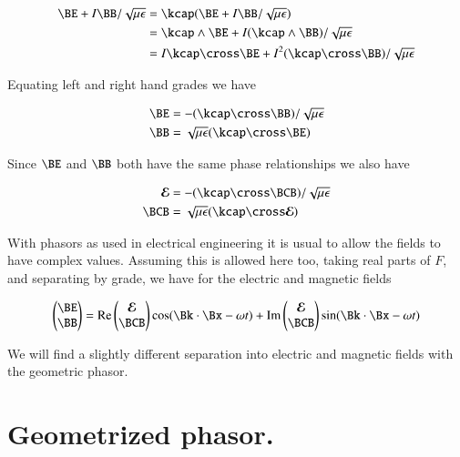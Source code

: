 \begin{align*}
\BE + I\BB/\sqrt{\mu\epsilon} 
&= \kcap (\BE + I\BB/\sqrt{\mu\epsilon} ) \\
&= \kcap \wedge \BE + I (\kcap \wedge \BB)/\sqrt{\mu\epsilon}  \\
&= I \kcap \cross \BE + I^2 (\kcap \cross \BB)/\sqrt{\mu\epsilon} 
\end{align*}

Equating left and right hand grades we have

\begin{align}\label{eqn:transverseWave:fooD}
\BE &= -(\kcap \cross \BB)/\sqrt{\mu\epsilon} \\
\BB &= \sqrt{\mu\epsilon} (\kcap \cross \BE)
\end{align}

Since $\BE$ and $\BB$ both have the same phase relationships we also have 

\begin{align}\label{eqn:transverseWave:fooDD}
\EE &= -(\kcap \cross \BCB)/\sqrt{\mu\epsilon} \\
\BCB &= \sqrt{\mu\epsilon} (\kcap \cross \EE)
\end{align}

With phasors as used in electrical engineering it is usual to allow the fields to have complex values.  Assuming this is allowed here too, taking real parts of $F$, and separating by grade, we have for the electric and magnetic fields

\begin{align}\label{eqn:transverseWave:fooX}
\begin{pmatrix}
\BE \\
\BB
\end{pmatrix}
=
\Real
\begin{pmatrix}
\EE \\
\BCB
\end{pmatrix}
\cos(\Bk \cdot \Bx - \omega t)
+\Imag
\begin{pmatrix}
\EE \\
\BCB
\end{pmatrix}
\sin(\Bk \cdot \Bx - \omega t)
\end{align}

We will find a slightly different separation into electric and magnetic fields with the geometric phasor.

\section{Geometrized phasor.}

